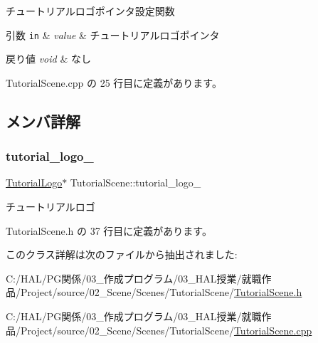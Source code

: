 チュートリアルロゴポインタ設定関数 


\begin{DoxyParams}[1]{引数}
\mbox{\tt in}  & {\em value} & チュートリアルロゴポインタ \\
\hline
\end{DoxyParams}

\begin{DoxyRetVals}{戻り値}
{\em void} & なし \\
\hline
\end{DoxyRetVals}


 Tutorial\+Scene.\+cpp の 25 行目に定義があります。



\subsection{メンバ詳解}
\mbox{\label{class_tutorial_scene_a3c2e0e47c2e6078bb7eff928d72fde2a}} 
\subsubsection{\texorpdfstring{tutorial\+\_\+logo\+\_\+}{tutorial\_logo\_}}
{\footnotesize\ttfamily \mbox{\hyperlink{class_tutorial_logo}{Tutorial\+Logo}}$\ast$ Tutorial\+Scene\+::tutorial\+\_\+logo\+\_\+\hspace{0.3cm}{\ttfamily [private]}}



チュートリアルロゴ 



 Tutorial\+Scene.\+h の 37 行目に定義があります。



このクラス詳解は次のファイルから抽出されました\+:\begin{DoxyCompactItemize}
\item 
C\+:/\+H\+A\+L/\+P\+G関係/03\+\_\+作成プログラム/03\+\_\+\+H\+A\+L授業/就職作品/\+Project/source/02\+\_\+\+Scene/\+Scenes/\+Tutorial\+Scene/\mbox{\hyperlink{_tutorial_scene_8h}{Tutorial\+Scene.\+h}}\item 
C\+:/\+H\+A\+L/\+P\+G関係/03\+\_\+作成プログラム/03\+\_\+\+H\+A\+L授業/就職作品/\+Project/source/02\+\_\+\+Scene/\+Scenes/\+Tutorial\+Scene/\mbox{\hyperlink{_tutorial_scene_8cpp}{Tutorial\+Scene.\+cpp}}\end{DoxyCompactItemize}
